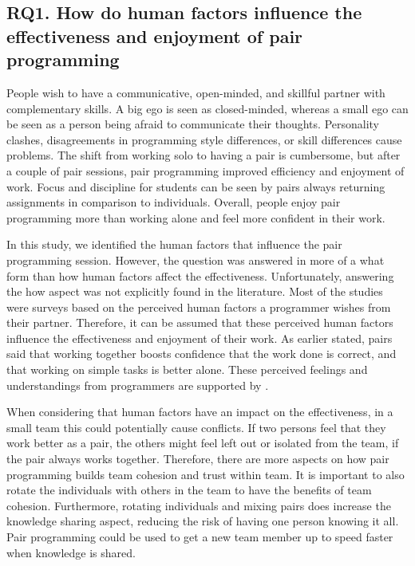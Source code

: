 \documentclass[conference]{IEEEtran}
\begin{document}
\subsection{RQ1. How do human factors influence the effectiveness and enjoyment of pair programming}
    
People wish to have a communicative, open-minded, and skillful partner with complementary skills. A big ego is seen as closed-minded, whereas a small ego can be seen as a person being afraid to communicate their thoughts. Personality clashes, disagreements in programming style differences, or skill differences cause problems. The shift from working solo to having a pair is cumbersome, but after a couple of pair sessions, pair programming improved efficiency and enjoyment of work. Focus and discipline for students can be seen by pairs always returning assignments in comparison to individuals. Overall, people enjoy pair programming more than working alone and feel more confident in their work.

In this study, we identified the human factors that influence the pair programming session. However, the question was answered in more of a what form than how human factors affect the effectiveness. Unfortunately, answering the how aspect was not explicitly found in the literature. Most of the studies were surveys based on the perceived human factors a programmer wishes from their partner. Therefore, it can be assumed that these perceived human factors influence the effectiveness and enjoyment of their work. As earlier stated, pairs said that working together boosts confidence that the work done is correct, and that working on simple tasks is better alone. These perceived feelings and understandings from programmers are supported by \cite{Arisholm2007Evaluating}.

When considering that human factors have an impact on the effectiveness, in a small team this could potentially cause conflicts. If two persons feel that they work better as a pair, the others might feel left out or isolated from the team, if the pair always works together. Therefore, there are more aspects on how pair programming builds team cohesion and trust within team. It is important to also rotate the individuals with others in the team to have the benefits of team cohesion. Furthermore, rotating individuals and mixing pairs does increase the knowledge sharing aspect, reducing the risk of having one person knowing it all. Pair programming could be used to get a new team member up to speed faster when knowledge is shared.
\end{document}
